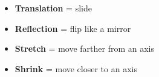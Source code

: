 \documentclass[11pt]{article}
\begin{document}
\begin{tcolorbox}[
colback=yellow!5,
colframe=orange,
title=\Large Transformation Vocabulary
]

\begin{itemize}

\item \textbf{Translation} = slide

\item \textbf{Reflection} = flip like a mirror

\item \textbf{Stretch} = move farther from an axis

\item \textbf{Shrink} = move closer to an axis

\end{itemize}

\end{tcolorbox}

\vspace{0.5cm}

\end{document}
